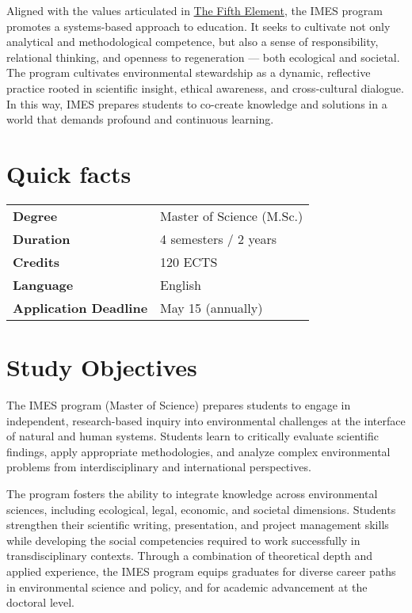 \documentclass[
  letterpaper,
  10pt,
  openany]{book}
\begin{document}
Aligned with the values articulated in
\href{https://thefifthelement.earth/}{The Fifth Element}, the IMES
program promotes a systems-based approach to education. It seeks to
cultivate not only analytical and methodological competence, but also a
sense of responsibility, relational thinking, and openness to
regeneration --- both ecological and societal. The program cultivates
environmental stewardship as a dynamic, reflective practice rooted in
scientific insight, ethical awareness, and cross-cultural dialogue. In
this way, IMES prepares students to co-create knowledge and solutions in
a world that demands profound and continuous learning.

\section*{Quick facts}\label{quick-facts}


\begin{longtable}[]{@{}ll@{}}
\toprule\noalign{}
\endhead
\bottomrule\noalign{}
\endlastfoot
\textbf{Degree} & Master of Science (M.Sc.) \\
\textbf{Duration} & 4 semesters / 2 years \\
\textbf{Credits} & 120 ECTS \\
\textbf{Language} & English \\
\textbf{Application Deadline} & May 15 (annually) \\
\end{longtable}

\section*{Study Objectives}\label{study-objectives}


The IMES program (Master of Science) prepares students to engage in
independent, research-based inquiry into environmental challenges at the
interface of natural and human systems. Students learn to critically
evaluate scientific findings, apply appropriate methodologies, and
analyze complex environmental problems from interdisciplinary and
international perspectives.

The program fosters the ability to integrate knowledge across
environmental sciences, including ecological, legal, economic, and
societal dimensions. Students strengthen their scientific writing,
presentation, and project management skills while developing the social
competencies required to work successfully in transdisciplinary
contexts. Through a combination of theoretical depth and applied
experience, the IMES program equips graduates for diverse career paths
in environmental science and policy, and for academic advancement at the
doctoral level.
\end{document}
